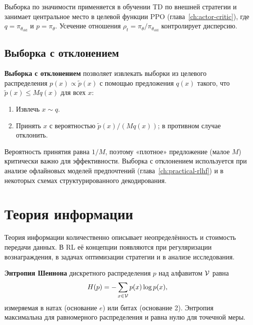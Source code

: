 Выборка по значимости применяется в обучении TD по внешней стратегии и занимает центральное место в целевой функции PPO (глава~\ref{ch:actor-critic}), где $q = \pi_{\theta_{\text{old}}}$ и $p = \pi_\theta$. Усечение отношения $\rho_t = \pi_\theta / \pi_{\theta_{\text{old}}}$ контролирует дисперсию.

\subsection*{Выборка с отклонением}

\textbf{Выборка с отклонением} позволяет извлекать выборки из целевого распределения $p(x) \propto \tilde{p}(x)$ с помощью предложения $q(x)$ такого, что $\tilde{p}(x) \leq M q(x)$ для всех $x$:

\begin{enumerate}[leftmargin=*]
    \item Извлечь $x \sim q$.
    \item Принять $x$ с вероятностью $\tilde{p}(x)/(M q(x))$; в противном случае отклонить.
\end{enumerate}

Вероятность принятия равна $1/M$, поэтому «плотное» предложение (малое $M$) критически важно для эффективности. Выборка с отклонением используется при анализе офлайновых моделей предпочтений (глава~\ref{ch:practical-rlhf}) и в некоторых схемах структурированного декодирования.

\section{Теория информации}
\label{app:info-theory}

Теория информации количественно описывает неопределённость и стоимость передачи данных. В RL её концепции появляются при регуляризации вознаграждения, в задачах оптимизации стратегии и в анализе исследования.

\begin{definition}[Энтропия]
\label{def:entropy}
\textbf{Энтропия Шеннона} дискретного распределения $p$ над алфавитом $\mathcal{V}$ равна
\[
    H(p) = -\sum_{x \in \mathcal{V}} p(x)\log p(x),
\]
измеряемая в натах (основание $e$) или битах (основание 2). Энтропия максимальна для равномерного распределения и равна нулю для точечной меры.
\end{definition}

